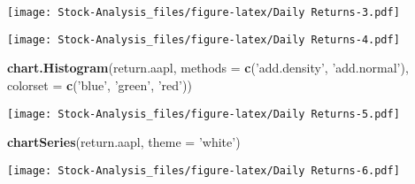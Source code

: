 \documentclass[
]{article}
\newenvironment{Shaded}{\begin{snugshade}}{\end{snugshade}}
\newcommand{\CommentTok}[1]{\textcolor[rgb]{0.56,0.35,0.01}{\textit{#1}}}
\newcommand{\DataTypeTok}[1]{\textcolor[rgb]{0.13,0.29,0.53}{#1}}
\newcommand{\DecValTok}[1]{\textcolor[rgb]{0.00,0.00,0.81}{#1}}
\newcommand{\KeywordTok}[1]{\textcolor[rgb]{0.13,0.29,0.53}{\textbf{#1}}}
\newcommand{\NormalTok}[1]{#1}
\newcommand{\OperatorTok}[1]{\textcolor[rgb]{0.81,0.36,0.00}{\textbf{#1}}}
\newcommand{\StringTok}[1]{\textcolor[rgb]{0.31,0.60,0.02}{#1}}
\begin{document}
\texttt{[image: Stock-Analysis\_files/figure-latex/Daily Returns-3.pdf]}

\begin{Shaded}
\end{Shaded}

\texttt{[image: Stock-Analysis\_files/figure-latex/Daily Returns-4.pdf]}

\begin{Shaded}
\begin{Highlighting}[]
\KeywordTok{chart.Histogram}\NormalTok{(return.aapl,}
                \DataTypeTok{methods =} \KeywordTok{c}\NormalTok{(}\StringTok{'add.density'}\NormalTok{, }\StringTok{'add.normal'}\NormalTok{),}
                \DataTypeTok{colorset =} \KeywordTok{c}\NormalTok{(}\StringTok{'blue'}\NormalTok{, }\StringTok{'green'}\NormalTok{, }\StringTok{'red'}\NormalTok{))}
\end{Highlighting}
\end{Shaded}

\texttt{[image: Stock-Analysis\_files/figure-latex/Daily Returns-5.pdf]}

\begin{Shaded}
\begin{Highlighting}[]
\KeywordTok{chartSeries}\NormalTok{(return.aapl, }\DataTypeTok{theme =} \StringTok{'white'}\NormalTok{)}
\end{Highlighting}
\end{Shaded}

\texttt{[image: Stock-Analysis\_files/figure-latex/Daily Returns-6.pdf]}

\begin{Shaded}
\end{Shaded}
\end{document}
